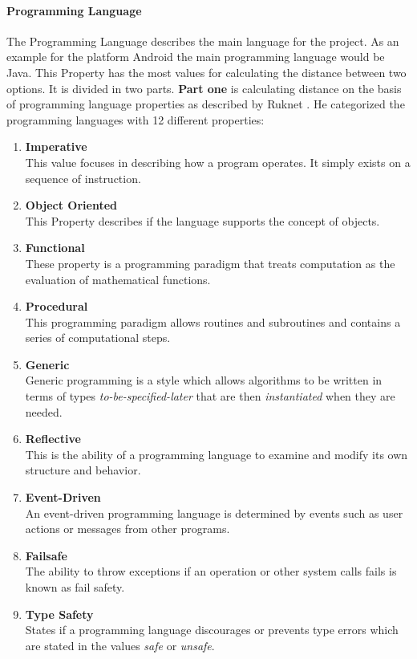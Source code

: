 \paragraph*{\textbf{Programming Language}}
The Programming Language describes the main language for the project. As an example for the platform Android the main programming language would be Java. This Property has the most values for calculating the distance between two options. It is divided in two parts. \textbf{Part one} is calculating distance on the basis of programming language properties as described by Ruknet \cite{ruknet}. He categorized the programming languages with 12 different properties:
\begin{enumerate}
	\item \textbf{Imperative}\\ This value focuses in describing how a program operates. It simply exists on a sequence of instruction.
	\item \textbf{Object Oriented}\\ This Property describes if the language supports the concept of objects.
	\item \textbf{Functional}\\ These property is a programming paradigm that treats computation as the evaluation of mathematical functions. 
	\item \textbf{Procedural}\\ This programming paradigm allows routines and subroutines and contains a series of computational steps.
	\item \textbf{Generic}\\ Generic programming is a style which allows algorithms to be written in terms of types \textit{to-be-specified-later} that are then \textit{instantiated} when they are needed.
	\item \textbf{Reflective}\\ This is the ability of a programming language to examine and modify its own structure and behavior.
	\item \textbf{Event-Driven}\\ An event-driven programming language is determined by events such as user actions or messages from other programs.
	\item \textbf{Failsafe}\\ The ability to throw exceptions if an operation or other system calls fails is known as fail safety.
	\item \textbf{Type Safety}\\States if a programming language discourages or prevents type errors which are stated in the values \textit{safe} or \textit{unsafe}.

\end{enumerate}
